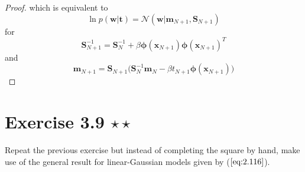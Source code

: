 \begin{proof}
    which is equivalent to
    \begin{equation*}
        \ln p(\mathbf{w} | \mathbf{t}) = \mathcal{N}(\mathbf{w} | \mathbf{m}_{N + 1}, \mathbf{S}_{N + 1})
    \end{equation*}
    for
    \begin{equation*}
        \mathbf{S}_{N + 1}^{-1}
        = \mathbf{S}_N^{-1} + \beta \bm{\phi}(\mathbf{x}_{N + 1})\bm{\phi}(\mathbf{x}_{N + 1})^T
        \tag{3.8.2}\label{eq:3.8.2}
    \end{equation*}
    and
    \begin{equation*}
        \mathbf{m}_{N + 1}
        = \mathbf{S}_{N + 1}\big(\mathbf{S}_N^{-1} \mathbf{m}_N 
             - \beta t_{N + 1} \bm{\phi}(\mathbf{x}_{N + 1})\big)
    \end{equation*}
\end{proof}

\section*{Exercise 3.9 $\star \star$}
Repeat the previous exercise but instead of completing the square by hand,
make use of the general result for linear-Gaussian models given by 
($\ref{eq:2.116}$).

\vspace{1em}

